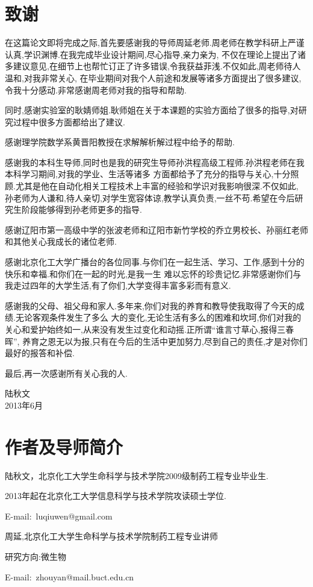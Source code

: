 \chapter*{致谢}
在这篇论文即将完成之际,首先要感谢我的导师周延老师.周老师在教学科研上严谨认真,学识渊博.在我完成毕业设计期间,尽心指导,亲力亲为,
不仅在理论上提出了诸多建议意见,在细节上也帮忙订正了许多错误,令我获益菲浅.不仅如此,周老师待人温和,对我非常关心,
在毕业期间对我个人前途和发展等诸多方面提出了很多建议,令我十分感动.非常感谢周老师对我的指导和帮助.\par
同时,感谢实验室的耿婧师姐.耿师姐在关于本课题的实验方面给了很多的指导,对研究过程中很多方面都给出了建议.\par
感谢理学院数学系黄晋阳教授在求解解析解过程中给予的帮助.\par
感谢我的本科生导师,同时也是我的研究生导师孙洪程高级工程师.孙洪程老师在我本科学习期间,对我的学业、生活等诸多
方面都给予了充分的指导与关心,十分照顾.尤其是他在自动化相关工程技术上丰富的经验和学识对我影响很深.不仅如此,
孙老师为人谦和,待人亲切,对学生宽容体谅,教学认真负责,一丝不苟.希望在今后研究生阶段能够得到孙老师更多的指导.\par
感谢辽阳市第一高级中学的张波老师和辽阳市新竹学校的乔立男校长、孙丽红老师和其他关心我成长的诸位老师.\par
感谢北京化工大学广播台的各位同事.与你们在一起生活、学习、工作,感到十分的快乐和幸福.和你们在一起的时光,是我一生
难以忘怀的珍贵记忆.非常感谢你们与我走过四年的大学生活,有了你们,大学变得丰富多彩而有意义.\par
感谢我的父母、祖父母和家人.多年来,你们对我的养育和教导使我取得了今天的成绩.无论客观条件发生了多么
大的变化,无论生活有多么的困难和坎坷,你们对我的关心和爱护始终如一,从来没有发生过变化和动摇.正所谓``谁言寸草心,报得三春晖'',
养育之恩无以为报,只有在今后的生活中更加努力,尽到自己的责任,才是对你们最好的报答和补偿.\par
最后,再一次感谢所有关心我的人.
\par
\begin{flushright}
\begin{minipage}[t]{7em}
\centering\kaishu
陆秋文\\
2013年6月
\end{minipage}
\end{flushright}


\chapter*{作者及导师简介}
\noindent 陆秋文，北京化工大学生命科学与技术学院2009级制药工程专业毕业生.\par
\noindent 2013年起在北京化工大学信息科学与技术学院攻读硕士学位.\par
\noindent E-mail:~luqiuwen@gmail.com\par

\vspace{3em}
\noindent 周延,北京化工大学生命科学与技术学院制药工程专业讲师\par
\noindent 研究方向:微生物\par
\noindent E-mail:~zhouyan@mail.buct.edu.cn